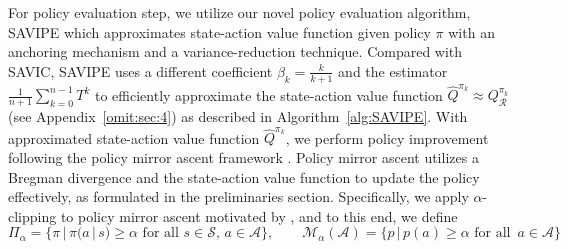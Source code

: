\documentclass{article}
\theoremstyle{definition}
\theoremstyle{remark}
\newcommand{\cA}{\mathcal{A}}
\newcommand{\cS}{\mathcal{S}}
\newcommand{\cM}{\mathcal{M}}
\newcommand{\cR}{\mathcal{R}}
\begin{document}
For policy evaluation step, we utilize our novel policy evaluation algorithm, SAVIPE which approximates state-action value function given policy $\pi$ with an anchoring mechanism and a variance-reduction technique. Compared with SAVIC, SAVIPE uses a different coefficient $\beta_k=\frac{k}{k+1}$ and the estimator $\frac{1}{n+1}\sum^{n-1}_{k=0}T^k$ to efficiently approximate the state-action value function $\hat{Q}^{\pi_k} \approx Q_\cR^{\pi_k}$ (see Appendix~\ref{omit:sec:4}) as described in Algorithm~\ref{alg:SAVIPE}. With approximated state-action value function $\hat{Q}^{\pi_k}$, we perform policy improvement following the policy mirror ascent framework \cite{shani2020adaptive,xiao2022convergence}. Policy mirror ascent utilizes a Bregman divergence and the state-action value function to update the policy effectively, as formulated in the preliminaries section. Specifically, we apply $\alpha$-clipping to policy mirror ascent motivated by \citep{lee2025multi}, and to this end, we define
\[
\Pi_{\alpha} = \{ \pi \,|\, \pi (a \,|\, s) \ge \alpha\text{ for all }s\in \cS,\,a\in \cA\}, \qquad \cM_\alpha(\cA) =\{p \,|\, p(a) \ge \alpha \text{ for all }\,a\in \cA\}
\]
\end{document}
